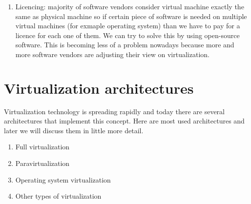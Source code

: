 \begin{enumerate}
\item Licencing: majority of software vendors consider virtual machine exactly the same as physical machine so if certain piece of software is needed on multiple virtual machines (for exmaple operating system) than we have to pay for a licence for each one of them. We can try to solve this by using open-source software. This is becoming less of a problem nowadays because more and more software vendors are adjusting their view on virtualization.
\end{enumerate}


\section{Virtualization architectures}
Virtualization technology is spreading rapidly and today there are several architectures that implement this concept. Here are most used architectures and later we will discuss them in little more detail.
\begin{enumerate}
\item Full virtualization
\item Paravirtualization
\item Operating system virtualization
\item Other types of virtualization
\end{enumerate}

